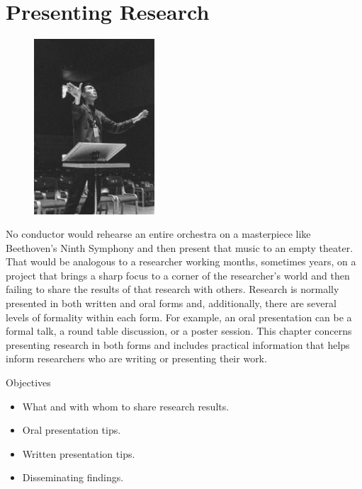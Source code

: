 \chapter{Presenting Research}

\begin{figure}
	\centering
	\includegraphics[width=0.4\textwidth]{gfx/15-conduct} 
\end{figure}

No conductor would rehearse an entire orchestra on a masterpiece like Beethoven's Ninth Symphony and then present that music to an empty theater. That would be analogous to a researcher working months, sometimes years, on a project that brings a sharp focus to a corner of the researcher's world and then failing to share the results of that research with others. Research is normally presented in both written and oral forms and, additionally, there are several levels of formality within each form. For example, an oral presentation can be a formal talk, a round table discussion, or a poster session. This chapter concerns presenting research in both forms and includes practical information that helps inform researchers who are writing or presenting their work.

\begin{center}
	\begin{objbox}{Objectives}
		\begin{itemize}
			\setlength{\itemsep}{0pt}
			\setlength{\parskip}{0pt}
			\setlength{\parsep}{0pt}
			
			\item What and with whom to share research results.
			\item Oral presentation tips.
			\item Written presentation tips.
			\item Disseminating findings.
		\end{itemize}
	\end{objbox}
\end{center}

